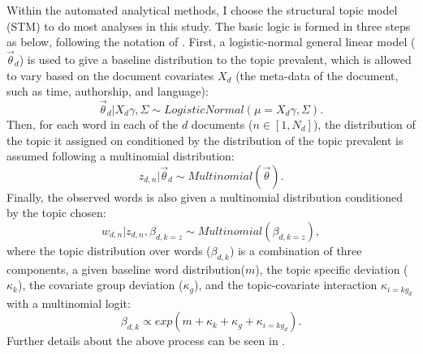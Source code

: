 \documentclass[abstracton,UTF8]{ctexart}
\begin{document}
Within the automated analytical methods, I choose the structural topic model (STM) to do most analyses in this study. The basic logic is formed in three steps as below, following the notation of \cite{Roberts2014a}. First, a logistic-normal general linear model ($\vec{\theta}_d$) is used to give a baseline distribution to the topic prevalent, which is allowed to vary based on the document covariates $X_d$ (the meta-data of the document, such as time, authorship, and language):
\begin{equation*}
\vec{\theta}_d | X_d\gamma, \Sigma \sim LogisticNormal(\mu =  X_d\gamma, \Sigma). 
\end{equation*} Then, for each word in each of the $d$ documents ($n \in [1, N_d]$), the distribution of the topic it assigned on conditioned by the distribution of the topic prevalent is assumed following a multinomial distribution: 
\begin{equation*}
z_{d,n} | \vec{\theta}_d \sim Multinomial(\vec{\theta}).
\end{equation*}
Finally, the observed words is also given a multinomial distribution conditioned by the topic chosen: 
\begin{equation*}
w_{d,n} | z_{d,n}, \beta_{d,k = z} \sim Multinomial(\beta_{d,k = z}), 
\end{equation*} where the topic distribution over words ($\beta_{d,k}$) is a combination of three components, a given baseline word distribution($ m $), the topic specific deviation ($\kappa_k$), the covariate group deviation ($\kappa_g$), and the topic-covariate interaction $\kappa_{i = kg_d}$ with a multinomial logit:
\begin{equation*}
\beta_{d,k} \varpropto exp(m + \kappa_k + \kappa_g + \kappa_{i = kg_d}). 
\end{equation*} Further details about the above process can be seen in \citep{Lucas2015,Roberts2014,Roberts2013}. 
\end{document}
